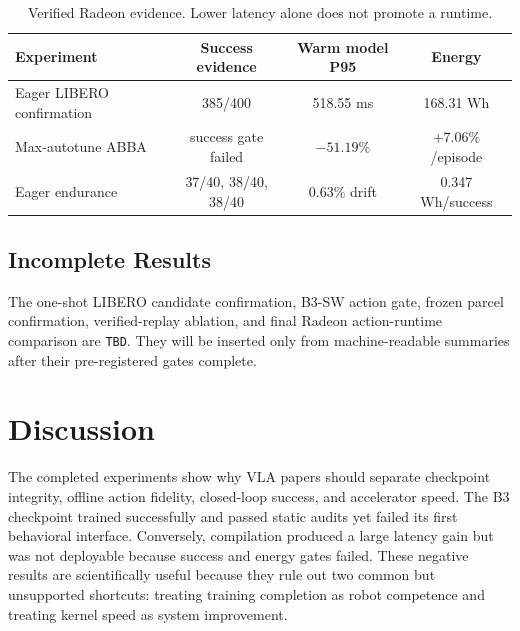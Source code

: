 \documentclass[11pt]{article}
\begin{document}
\begin{table}[t]
\centering
\caption{Verified Radeon evidence. Lower latency alone does not promote a runtime.}
\label{tab:radeon}
\begin{tabular}{@{}lccc@{}}
\toprule
Experiment & Success evidence & Warm model P95 & Energy \\
\midrule
Eager LIBERO confirmation & 385/400 & 518.55 ms & 168.31 Wh \\
Max-autotune ABBA & success gate failed & $-51.19\%$ & $+7.06\%$/episode \\
Eager endurance & 37/40, 38/40, 38/40 & 0.63\% drift & 0.347 Wh/success \\
\bottomrule
\end{tabular}
\end{table}

\subsection{Incomplete Results}

The one-shot LIBERO candidate confirmation, B3-SW action gate, frozen parcel
confirmation, verified-replay
ablation, and final Radeon action-runtime comparison are \texttt{TBD}. They will
be inserted only from machine-readable summaries after their pre-registered
gates complete.

\section{Discussion}

The completed experiments show why VLA papers should separate checkpoint
integrity, offline action fidelity, closed-loop success, and accelerator speed.
The B3 checkpoint trained successfully and passed static audits yet failed its
first behavioral interface. Conversely, compilation produced a large latency
gain but was not deployable because success and energy gates failed. These
negative results are scientifically useful because they rule out two common but
unsupported shortcuts: treating training completion as robot competence and
treating kernel speed as system improvement.
\end{document}
